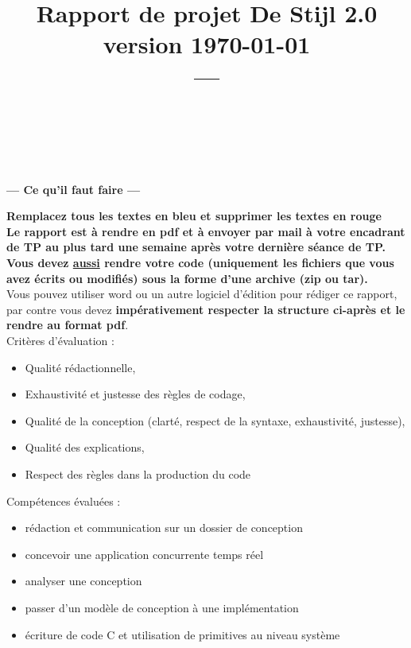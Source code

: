 \documentclass[11pt, a4paper]{paper}
\title{{\Huge Rapport de projet De Stijl 2.0}\\
{\large version \today}\\
---\\
}
\author{\color{blue}{Mettez ici vos noms et les parties sur lesquelles vous avez travaillées :}\\
\color{blue}{conception, robot, vidéo, mission, intégration, rédaction du compte-rendu}\\
\color{blue}{Exemple : P.-E. Hladik (conception, robot, rédaction du compte-rendu)}
}
\begin{document}
\maketitle


{\color{red}
\begin{framed}
\begin{center}{\bf\Large --- Ce qu'il faut faire --- } \end{center}

{\bf Remplacez tous les textes en bleu et supprimer les textes en rouge}\\


{\bf Le rapport est à rendre en pdf et à envoyer par mail à votre encadrant de TP au plus tard une semaine après votre dernière séance de TP.}\\

{\bf Vous devez \underline{aussi} rendre votre code (uniquement les fichiers que vous avez écrits ou modifiés) sous la forme d'une archive (zip ou tar).}\\

Vous pouvez utiliser word ou un autre logiciel d'édition pour rédiger ce rapport, par contre vous devez  {\bf impérativement respecter la structure ci-après et le rendre au format pdf}.\\


Critères d'évaluation :
\begin{itemize}
	\item Qualité rédactionnelle,
	\item Exhaustivité et justesse des règles de codage,
	\item Qualité de la conception (clarté, respect de la syntaxe, exhaustivité, justesse),
	\item Qualité des explications,
	\item Respect des règles dans la production du code\\
\end{itemize}

Compétences évaluées :
\begin{itemize}
	\item rédaction et communication sur un dossier de conception
	\item concevoir une application concurrente temps réel
	\item analyser une conception
	\item passer d'un modèle de conception à une implémentation
	\item écriture de code C et utilisation de primitives au niveau système
\end{itemize}
\end{framed}
}
\end{document}
